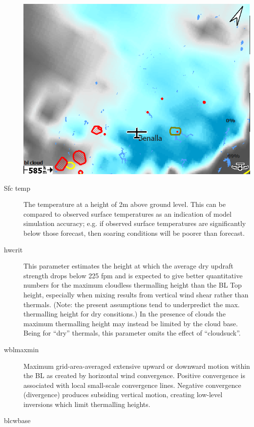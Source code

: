 \documentclass[a4paper,12pt]{refrep}
\begin{document}
\begin{description}
\begin{center}
\includegraphics[angle=0,width=0.8\linewidth,keepaspectratio='true']{figures/rasp-blcloudpct.png}
\end{center}

\item[Sfc temp] 
The temperature at a height of 2m above ground level.  This can be
compared to observed surface temperatures as an indication of model
simulation accuracy; e.g. if observed surface temperatures are
significantly below those forecast, then soaring conditions will be
poorer than forecast.
\item[hwcrit]  
This parameter estimates the height at which the average dry updraft
strength drops below 225 fpm and is expected to give better
quantitative numbers for the maximum cloudless thermalling height than
the BL Top height, especially when mixing results from vertical wind
shear rather than thermals.  (Note: the present assumptions tend to
underpredict the max. thermalling height for dry consitions.) In the
presence of clouds the maximum thermalling height may instead be
limited by the cloud base.  Being for ``dry'' thermals, this parameter
omits the effect of ``cloudsuck''.
\item[wblmaxmin]  
Maximum grid-area-averaged extensive upward or downward motion within
the BL as created by horizontal wind convergence. Positive convergence
is associated with local small-scale convergence lines.  Negative
convergence (divergence) produces subsiding vertical motion, creating
low-level inversions which limit thermalling heights.
\item[blcwbase]   
\end{description}
\end{document}

